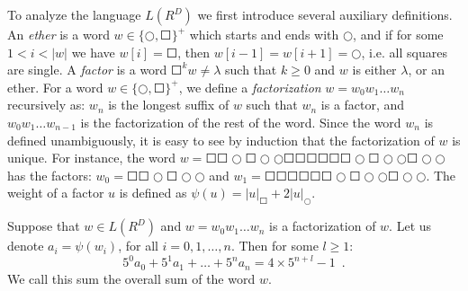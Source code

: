 To analyze the language $L(R^D)$ we first introduce several auxiliary definitions. An \emph{ether} is a word $w \in \{\Circle, \Square\}^+$ which starts and ends with $\Circle$, and if for some $1 < i < |w|$ we have $w[i] = \Square$, then $w[i-1] = w[i+1] = \Circle$, i.e. all squares are single. A \emph{factor} is a word $\Square^k w \neq \lambda$ such that $k \ge 0$ and $w$ is either $\lambda$, or an ether. For a word $w \in \{\Circle, \Square\}^+$, we define a \emph{factorization} $w = w_0 w_1 \ldots w_n$ recursively as: $w_n$ is the longest suffix of $w$ such that $w_n$ is a factor, and $w_0 w_1 \ldots w_{n-1}$ is the factorization of the rest of the word. Since the word $w_n$ is defined unambiguously, it is easy to see by induction that the factorization of $w$ is unique. For instance, the word $w = \Square \Square \Circle \Square \Circle \Circle \Square \Square \Square \Square \Square \Square \Circle \Square \Circle \Circle \Square \Circle \Circle$ has the factors: $w_0 = \Square \Square \Circle \Square \Circle \Circle$ and $w_1 = \Square \Square \Square \Square \Square \Square \Circle \Square \Circle \Circle \Square \Circle \Circle$. The weight of a factor $u$ is defined as $\psi(u) = |u|_{\Square} + 2 |u|_{\Circle}$.

\begin{lemma}\label{lemma:circle-square-3clRA}
Suppose that $w \in L(R^D)$ and $w = w_0 w_1 \ldots w_n$ is a factorization of $w$. Let us denote $a_i = \psi(w_i)$, for all $i = 0, 1, \ldots, n$. Then for some $l \ge 1$:
$$
5^0 a_0 + 5^1 a_1 + \ldots + 5^n a_n = 4 \times 5^{n+l} - 1\enspace.
$$
We call this sum the overall sum of the word $w$.
\end{lemma}

